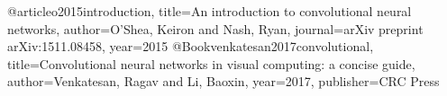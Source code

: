 @article{o2015introduction,
title={An introduction to convolutional neural networks},
author={O’Shea, Keiron and Nash, Ryan},
journal={arXiv preprint arXiv:1511.08458},
year={2015}
}
@Book{venkatesan2017convolutional,
title={Convolutional neural networks in visual computing: a concise guide},
author={Venkatesan, Ragav and Li, Baoxin},
year={2017},
publisher={CRC Press}
}